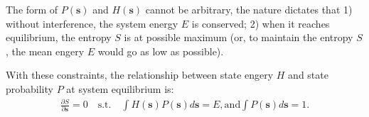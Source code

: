 \documentclass[11pt]{article}
\def\style{apa}
\numberwithin{equation}{section}
\newcommand{\bs}{\boldsymbol}
\newcommand{\vs}{\bs{s}}
\newcommand{\PDV}[2]{\frac{\partial #1}{\partial #2}}
\begin{document}
The form of $P(\vs)$ and $H(\vs)$ cannot be arbitrary, the nature dictates that 1) without interference, the system energy $E$ is conserved; 2) when it reaches equilibrium, the entropy $S$ is at possible maximum (or, to maintain the entropy $S$, the mean engery $E$ would go as low as possible).

With these constraints, the relationship between state engery $H$ and state probability $P$ at system equilibrium  is:
\begin{equation}
  \begin{split}
    \PDV{S}{\vs} = 0 
    \quad\textrm{s.t.}\quad\int{H(\vs)P(\vs)d\vs} = E, \textrm{and} \int{P(\vs)d\vs} = 1.
  \end{split}
\end{equation}

\clearpage
\singlespacing


%
\end{document}
